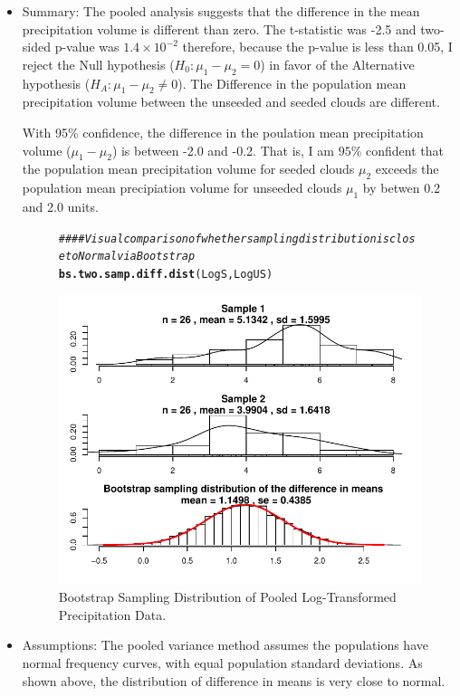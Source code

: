 \documentclass{article}\usepackage[]{graphicx}\usepackage[]{color}
\makeatletter
\def\maxwidth{ %
  \ifdim\Gin@nat@width>\linewidth
    \linewidth
  \else
    \Gin@nat@width
  \fi
}
\newcommand{\hlcom}[1]{\textcolor[rgb]{0.678,0.584,0.686}{\textit{#1}}}%
\newcommand{\hlstd}[1]{\textcolor[rgb]{0.345,0.345,0.345}{#1}}%
\newcommand{\hlkwd}[1]{\textcolor[rgb]{0.737,0.353,0.396}{\textbf{#1}}}%
\newenvironment{kframe}{%
 \def\at@end@of@kframe{}%
 \ifinner\ifhmode%
  \def\at@end@of@kframe{\end{minipage}}%
  \begin{minipage}{\columnwidth}%
 \fi\fi%
 \def\FrameCommand##1{\hskip\@totalleftmargin \hskip-\fboxsep
 \colorbox{shadecolor}{##1}\hskip-\fboxsep
     \hskip-\linewidth \hskip-\@totalleftmargin \hskip\columnwidth}%
 \MakeFramed {\advance\hsize-\width
   \@totalleftmargin\z@ \linewidth\hsize
   \@setminipage}}%
 {\par\unskip\endMakeFramed%
 \at@end@of@kframe}
\newenvironment{knitrout}{}{} %
\makeatother
\begin{document}
\begin{itemize}
\item  Summary:  The pooled analysis suggests that the difference in the mean precipitation volume is different than zero.  The t-statistic was -2.5 and two-sided p-value was $1.4 \times 10^{-2}$ therefore, because the p-value is less than 0.05, I reject the Null hypothesis ($H_0: \mu_1 - \mu_2 = 0$) in favor of the Alternative hypothesis ($H_A: \mu_1 - \mu_2 \ne 0$).  The Difference in the population mean precipitation volume between the unseeded and seeded clouds are different.  \

With 95\% confidence, the difference in the poulation mean precipitation volume ($\mu_1 - \mu_2$) is between -2.0 and -0.2.  That is, I am $95\%$ confident that the population mean precipitation volume for seeded clouds $\mu_2$ exceeds the population mean precipiation volume for unseeded clouds $\mu_1$ by betwen 0.2 and 2.0 units.

\begin{figure}[H]  \begin{center} \vspace{-0.45in}
\begin{knitrout}
\color{fgcolor}\begin{kframe}
\begin{alltt}
\hlcom{#### Visual comparison of whether sampling distribution is close to Normal via Bootstrap}
\hlkwd{bs.two.samp.diff.dist}\hlstd{(LogS, LogUS)}
\end{alltt}
\end{kframe}
\includegraphics[width=\maxwidth]{figure/1c_bootstrap} 

\end{knitrout}
\end{center} \caption{Bootstrap Sampling Distribution of Pooled Log-Transformed Precipitation Data.} \end{figure}

  \item Assumptions:  The pooled variance method assumes the populations have normal frequency curves, with equal population standard deviations.  As shown above, the distribution of difference in means is very close to normal.
\end{itemize}
\end{document}
